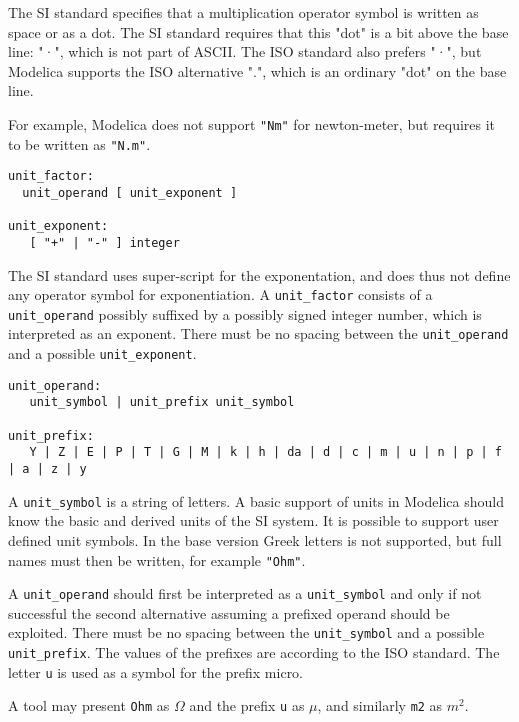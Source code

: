 The SI standard specifies that a multiplication operator symbol is written as space
or as a dot. The SI standard requires that this "dot" is a bit above the base line: "·", which is not part of ASCII.
The ISO standard also prefers "·", but Modelica supports the ISO alternative ".", which is an ordinary "dot" on the base line.

For example, Modelica does not support \lstinline!"Nm"! for newton-meter,
but requires it to be written as \lstinline!"N.m"!.

\begin{lstlisting}[language=grammar]
unit_factor:
  unit_operand [ unit_exponent ]

unit_exponent:
   [ "+" | "-" ] integer
\end{lstlisting}

The SI standard uses super-script for the exponentation, and does thus not define any operator symbol for exponentiation.
A \lstinline!unit_factor! consists of a \lstinline!unit_operand! possibly suffixed by a
possibly signed integer number, which is interpreted as an exponent.
There must be no spacing between the \lstinline!unit_operand! and a possible
\lstinline!unit_exponent!.

\begin{lstlisting}[language=grammar]
unit_operand:
   unit_symbol | unit_prefix unit_symbol

unit_prefix:
   Y | Z | E | P | T | G | M | k | h | da | d | c | m | u | n | p | f | a | z | y
\end{lstlisting}

A \lstinline!unit_symbol! is a string of letters. A basic support of units in
Modelica should know the basic and derived units of the SI system. It is
possible to support user defined unit symbols. In the base version Greek
letters is not supported, but full names must then be written, for
example \lstinline!"Ohm"!.

A \lstinline!unit_operand! should first be interpreted as a \lstinline!unit_symbol! and only
if not successful the second alternative assuming a prefixed operand
should be exploited. There must be no spacing between the \lstinline!unit_symbol!
and a possible \lstinline!unit_prefix!. The values of the prefixes are according to
the ISO standard. The letter \lstinline!u! is used as a symbol for the prefix
micro.

\begin{nonnormative}
A tool may present \lstinline!Ohm! as $\Omega$ and the prefix \lstinline!u! as $\mu$, and similarly \lstinline!m2! as $m^2$.
\end{nonnormative}

